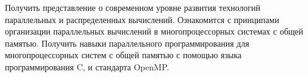 
Получить представление о современном уровне развития технологий параллельных и распределенных вычислений. Ознакомится с принципами организации параллельных вычислений в многопроцессорных системах с общей памятью. Получить навыки параллельного программирования для многопроцессорных систем с общей памятью с помощью языка программирования C, \gl и стандарта OpenMP.

